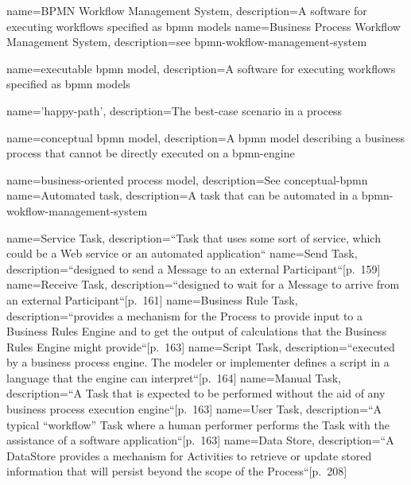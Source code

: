 {
	name={BPMN Workflow Management System},
	description={A software for executing workflows specified as \gls{bpmn} models}
}
{
	name={Business Process Workflow Management System},
	description={see \gls{bpmn-wokflow-management-system}}
}

{
	name={executable \gls{bpmn} model},
	description={A software for executing workflows specified as \gls{bpmn} models}
}

{
	name={'happy-path'},
	description={The best-case scenario in a process}
}

{
	name={conceptual \gls{bpmn} model},
	description={A \gls{bpmn} model describing a business process that cannot be directly executed on a \gls{bpmn-engine}}
}

{
	name={business-oriented process model},
	description={See \gls{conceptual-bpmn}}
}
{
	name={Automated task},
	description={A task that can be automated in a \gls{bpmn-wokflow-management-system}}
}

{
	name={Service Task},
	description={``Task that uses some sort of service, which could be a Web service or an automated application``\cite[p.~158]{bpmnstandard} }
}
{
	name={Send Task},
	description={``designed to send a Message to an external Participant``[p.~159]\cite{bpmnstandard} }
}
{
	name={Receive Task},
	description={``designed to wait for a Message to arrive from an external Participant``[p.~161]\cite{bpmnstandard} }
}
{
	name={Business Rule Task},
	description={``provides a mechanism for the Process to provide input to a Business Rules Engine and to get the output of calculations that the Business Rules Engine might provide``[p.~163]\cite{bpmnstandard} }
}
{
	name={Script Task},
	description={``executed by a business process engine. The modeler or implementer defines a script in a language that the engine can interpret``[p.~164]\cite{bpmnstandard} }
}
{
	name={Manual Task},
	description={``A Task that is expected to be performed without the aid of any business process execution engine``[p.~163]\cite{bpmnstandard} }
}
{
	name={User Task},
	description={``A typical “workflow” Task where a human performer performs the Task with the assistance of a software application``[p.~163]\cite{bpmnstandard} }
}
{
	name={Data Store},
	description={``A DataStore provides a mechanism for Activities to retrieve or update stored information that will persist beyond the
		scope of the Process``[p.~208]\cite{bpmnstandard} }
}

